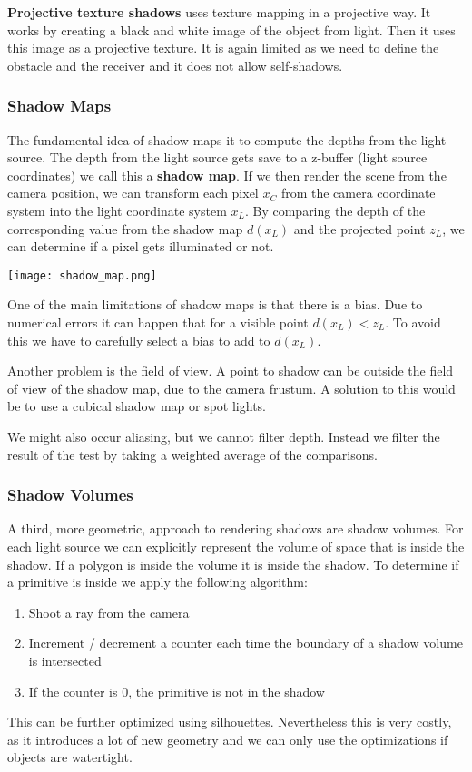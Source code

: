 \textbf{Projective texture shadows} uses texture mapping in a projective way. It works by creating a black and white image of the object from light. Then it uses this image as a projective texture. It is again limited as we need to define the obstacle and the receiver and it does not allow self-shadows.

\subsubsection{Shadow Maps}

The fundamental idea of shadow maps it to compute the depths from the light source. The depth from the light source gets save to a z-buffer (light source coordinates) we call this a \textbf{shadow map}. If we then render the scene from the camera position, we can transform each pixel $x_C$ from the camera coordinate system into the light coordinate system $x_L$. By comparing the depth of the corresponding value from the shadow map $d(x_L)$ and the projected point $z_L$, we can determine if a pixel gets illuminated or not. 
\begin{center}
	\texttt{[image: shadow\_map.png]}
\end{center}

One of the main limitations of shadow maps is that there is a bias. Due to numerical errors it can happen that for a visible point $d(x_L) < z_L$. To avoid this we have to carefully select a bias to add to $d(x_L)$. \medskip

Another problem is the field of view. A point to shadow can be outside the field of view of the shadow map, due to the camera frustum. A solution to this would be to use a cubical shadow map or spot lights. \medskip

We might also occur aliasing, but we cannot filter depth. Instead we filter the result of the test by taking a weighted average of the comparisons.


\subsubsection{Shadow Volumes}

A third, more geometric, approach to rendering shadows are shadow volumes. For each light source we can explicitly represent the volume of space that is inside the shadow. If a polygon is inside the volume it is inside the shadow. To determine if a primitive is inside we apply the following algorithm:
\begin{enumerate}
	\item Shoot a ray from the camera
	\item Increment / decrement a counter each time the boundary of a shadow volume is intersected
	\item If the counter is 0, the primitive is not in the shadow
\end{enumerate}

This can be further optimized using silhouettes. Nevertheless this is very costly, as it introduces a lot of new geometry and we can only use the optimizations if objects are watertight.
